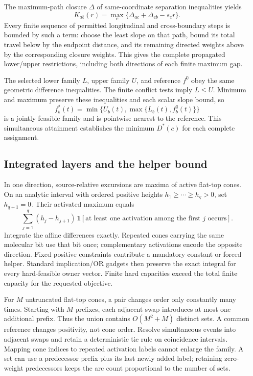 \documentclass[10pt,letterpaper]{article}
\newcommand{\ind}{\mathbf 1}
\begin{document}
The maximum-path closure $\Delta$ of same-coordinate separation inequalities yields
\[
 K_{ab}(r)=\max_c\{\Delta_{ac}+\Delta_{cb}-s_cr\}.
\]
Every finite sequence of permitted longitudinal and cross-boundary steps is bounded by such a term: choose the least slope on that path, bound its total travel below by the endpoint distance, and its remaining directed weights above by the corresponding closure weights. This gives the complete propagated lower/upper restrictions, including both directions of each finite maximum gap.

The selected lower family $L$, upper family $U$, and reference $f^0$ obey the same geometric difference inequalities. The finite conflict tests imply $L\le U$. Minimum and maximum preserve these inequalities and each scalar slope bound, so
\[
 f_b^*(t)=\min\{U_b(t),\max\{L_b(t),f_b^0(t)\}\}
\]
is a jointly feasible family and is pointwise nearest to the reference. This simultaneous attainment establishes the minimum $D^*(c)$ for each complete assignment.

\subsection{Integrated layers and the helper bound}
In one direction, source-relative excursions are maxima of active flat-top cones. On an analytic interval with ordered positive heights $h_1\ge\cdots\ge h_q>0$, set $h_{q+1}=0$. Their activated maximum equals
\[
 \sum_{j=1}^{q}(h_j-h_{j+1})\,
 \ind[\text{at least one activation among the first }j\text{ occurs}].
\]
Integrate the affine differences exactly. Repeated cones carrying the same molecular bit use that bit once; complementary activations encode the opposite direction. Fixed-positive constraints contribute a mandatory constant or forced helper. Standard implication/OR gadgets then preserve the exact integral for every hard-feasible owner vector. Finite hard capacities exceed the total finite capacity for the requested objective.

For $M$ untruncated flat-top cones, a pair changes order only constantly many times. Starting with $M$ prefixes, each adjacent swap introduces at most one additional prefix. Thus the union contains $O(M^2+M)$ distinct sets. A common reference changes positivity, not cone order. Resolve simultaneous events into adjacent swaps and retain a deterministic tie rule on coincidence intervals. Mapping cone indices to repeated activation labels cannot enlarge the family. A set can use a predecessor prefix plus its last newly added label; retaining zero-weight predecessors keeps the arc count proportional to the number of sets.
\end{document}
